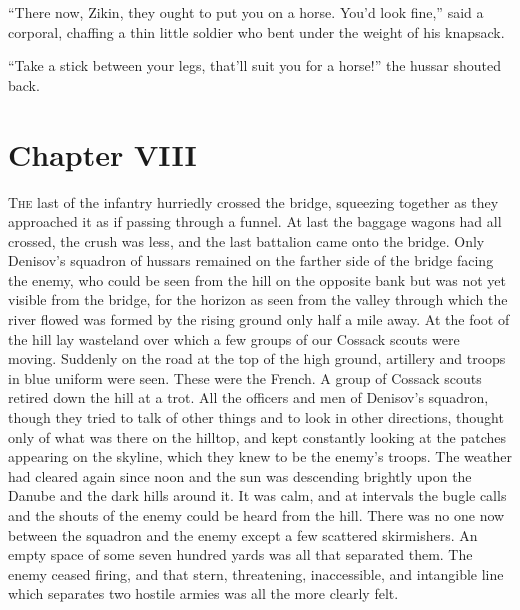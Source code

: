 ``There now, Zikin, they ought to put you on a horse. You'd look
fine,'' said a corporal, chaffing a thin little soldier who bent
under the weight of his knapsack.

``Take a stick between your legs, that'll suit you for a horse!''
the hussar shouted back.


\chapter*{Chapter VIII}
\ifaudio     {} \fi

\lettrine[lines=2, loversize=0.3, lraise=0]{\initfamily T}{he}
last of the infantry hurriedly crossed the bridge, squeezing
together as they approached it as if passing through a funnel. At
last the baggage wagons had all crossed, the crush was less, and
the last battalion came onto the bridge. Only Denisov's squadron
of hussars remained on the farther side of the bridge facing the
enemy, who could be seen from the hill on the opposite bank but
was not yet visible from the bridge, for the horizon as seen from
the valley through which the river flowed was formed by the
rising ground only half a mile away. At the foot of the hill lay
wasteland over which a few groups of our Cossack scouts were
moving. Suddenly on the road at the top of the high ground,
artillery and troops in blue uniform were seen. These were the
French. A group of Cossack scouts retired down the hill at a
trot. All the officers and men of Denisov's squadron, though they
tried to talk of other things and to look in other directions,
thought only of what was there on the hilltop, and kept
constantly looking at the patches appearing on the skyline, which
they knew to be the enemy's troops. The weather had cleared again
since noon and the sun was descending brightly upon the Danube
and the dark hills around it. It was calm, and at intervals the
bugle calls and the shouts of the enemy could be heard from the
hill. There was no one now between the squadron and the enemy
except a few scattered skirmishers. An empty space of some seven
hundred yards was all that separated them. The enemy ceased
firing, and that stern, threatening, inaccessible, and intangible
line which separates two hostile armies was all the more clearly
felt.

